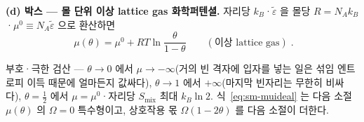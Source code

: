 \textbf{(d) 박스 --- 몰 단위 이상 lattice gas 화학퍼텐셜.} 자리당 $k_B$·$\tilde\varepsilon$ 을 몰당
$R=N_Ak_B$·$\mu^0\equiv N_A\tilde\varepsilon$ 으로 환산하면
\begin{equation}
\boxed{\;\mu(\theta)=\mu^0+RT\ln\frac{\theta}{1-\theta}\qquad(\text{이상 lattice gas})\;.}
\label{eq:sm-muideal}
\end{equation}
\begin{verifybox}
부호·극한 검산 --- $\theta\to0$ 에서 $\mu\to-\infty$(거의 빈 격자에 입자를 넣는 일은 섞임 엔트로피 이득 때문에
얼마든지 값싸다), $\theta\to1$ 에서 $+\infty$(마지막 빈자리는 무한히 비싸다), $\theta=\tfrac12$ 에서
$\mu=\mu^0$·자리당 $S_\mathrm{mix}$ 최대 $k_B\ln2$. 식~\eqref{eq:sm-muideal} 는 다음 소절 $\mu(\theta)$ 의
$\Omega=0$ 특수형이고, 상호작용 몫 $\Omega(1-2\theta)$ 를 다음 소절이 더한다.
\end{verifybox}

